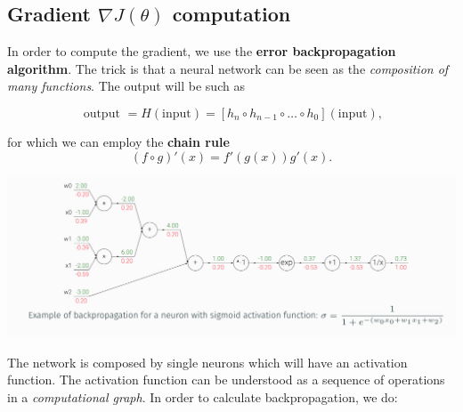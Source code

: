 \documentclass[10pt]{report}
\begin{document}
\subsection{Gradient \(\nabla J(\theta)\) computation}
\label{sec:orgc62c83e}
In order to compute the gradient, we use the \textbf{error backpropagation
algorithm}. The trick is that a neural network can be seen as the
\emph{composition of many functions}. The output will be such as

\[\mbox{ output } = H(\mbox{input}) = [h_n \circ h_{n-1} \circ \dots \circ h_0](\mbox{input}),\]

for which we can employ the \textbf{chain rule}
\[(f \circ g)'(x) = f'(g(x))g'(x).\]

\begin{center}
\includegraphics[scale=0.35]{./pics/cnn/backpropagation.jpg}
\end{center}

The network is composed by single neurons which will have an activation
function. The activation function can be understood as a sequence of
operations in a \emph{computational graph}. In order to calculate
backpropagation, we do:
\end{document}

